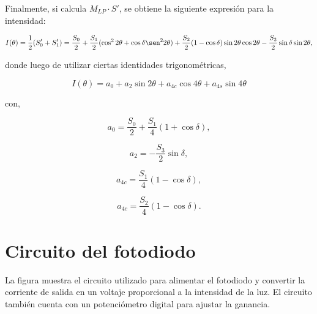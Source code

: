 \documentclass[11pt,a4paper]{article}
\begin{document}
Finalmente, si calcula $M_{LP} \cdot S'$, se obtiene la siguiente expresión para la intensidad:

\begin{equation*}
    I(\theta) = \frac{1}{2} (S_0' + S_1') = \frac{S_0}{2} + \frac{S_1}{2} (\cos^2 2\theta + \cos \delta \sen^2 2\theta) + \frac{S_2}{2}(1 - \cos \delta) \sin 2\theta \cos 2\theta - \frac{S_3}{2} \sin \delta \sin 2\theta,
\end{equation*}

\noindent donde luego de utilizar ciertas identidades trigonométricas,

\begin{equation}
    I(\theta) = a_0 + a_2 \sin 2\theta + a_{4c} \cos 4\theta + a_{4s}\sin 4\theta 
\end{equation}

\noindent con,

\begin{equation*}
    a_0 = \frac{S_0}{2} + \frac{S_1}{4}(1+\cos \delta),
\end{equation*}

\begin{equation*}
    a_2 = - \frac{S_3}{2}\sin \delta,
\end{equation*}

\begin{equation*}
    a_{4c} = \frac{S_1}{4}(1-\cos \delta),
\end{equation*}

\begin{equation*}
    a_{4c} = \frac{S_2}{4}(1-\cos \delta).
\end{equation*}

\section{Circuito del fotodiodo}\label{apendice: circuito_fotodiodo}
La figura muestra el circuito utilizado para alimentar el fotodiodo y convertir la corriente de salida en un voltaje proporcional a la intensidad de la luz. El circuito también cuenta con un potenciómetro digital para ajustar la ganancia.
\end{document}
